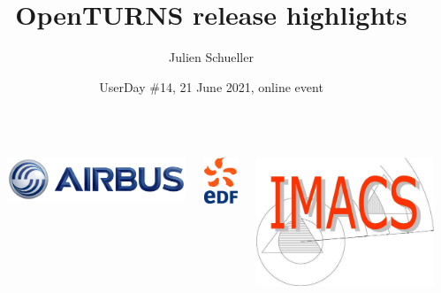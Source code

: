 \documentclass{beamer}
\title[OpenTURNS]{OpenTURNS release highlights}
\author[OpenTURNS et al.]{Julien Schueller}
\date[]{UserDay \#14, 21 June 2021, online event}
\begin{document}

  \begin{frame}
  \titlepage

  \begin{columns}
  \begin{column}[t]{0.05\textwidth}
        \end{column}
  
  \begin{center}
\includegraphics[height=0.04\textheight]{figures/airbus-logo-3d-blue.png}
\end{center}

  \begin{center}
\includegraphics[height=0.09\textheight]{figures/logo-edf.jpg}
\end{center}

  \begin{center}
\includegraphics[height=0.09\textheight]{figures/imacs-logo.jpg}
\end{center}


\end{columns}
\end{frame}
\end{document}

